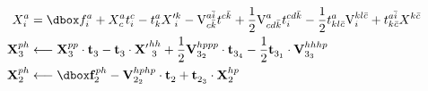 \documentclass[thesis.tex]{subfiles}
\begin{document}
\begin{equation}
\begin{align}
\end{align}
\begin{align}
  \xint{a}{i} &= \dboxed{\fint{a}{i}} + \xint{a}{c}\tamp{c}{i} - \tamp{a}{k}\xxint{k}{i} - \vint{a\bar{i}}{c\bar{k}}\tamp{c\bar{k}}{} + \frac{1}{2}\vint{a}{cd\bar{k}}\tamp{cd\bar{k}}{i} - \frac{1}{2}\tamp{a}{kl\bar{c}}\vint{kl\bar{c}}{i} + \tamp{a\bar{i}}{k\bar{c}}\xint{k\bar{c}}{} \notag \\
  \bxint{ph}{3} &\longleftarrow \bxint{pp}{3}\cdot\btamp{}{3} - \btamp{}{3}\cdot\bxxint{hh}{3} + \frac{1}{2}\bvint{hppp}{3_{2}}\cdot\btamp{}{3_{4}} - \frac{1}{2}\btamp{}{3_{1}}\cdot\bvint{hhhp}{3_{3}} \notag \\
  \bxint{ph}{2} &\longleftarrow \dboxed{\bfint{ph}{2}} - \bvint{hphp}{2_{2}}\cdot\btamp{}{2} + \btamp{}{2_{3}}\cdot\bxint{hp}{2}
\end{align}



\end{equation}
\end{document}
